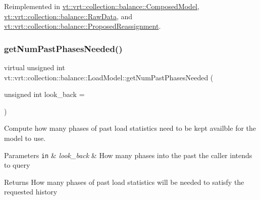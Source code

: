 Reimplemented in \hyperlink{classvt_1_1vrt_1_1collection_1_1balance_1_1_composed_model_a7b383954706cb8069e841a87c3ff3f8f}{vt\+::vrt\+::collection\+::balance\+::\+Composed\+Model}, \hyperlink{structvt_1_1vrt_1_1collection_1_1balance_1_1_raw_data_a586c3223d1f69ee9d5eb2930ff659051}{vt\+::vrt\+::collection\+::balance\+::\+Raw\+Data}, and \hyperlink{structvt_1_1vrt_1_1collection_1_1balance_1_1_proposed_reassignment_ad265d4881094bb11cb538e7340bc8a49}{vt\+::vrt\+::collection\+::balance\+::\+Proposed\+Reassignment}.

\mbox{\label{structvt_1_1vrt_1_1collection_1_1balance_1_1_load_model_ac061725720a2017908090863080b70e5}} 
\subsubsection{\texorpdfstring{get\+Num\+Past\+Phases\+Needed()}{getNumPastPhasesNeeded()}}
{\footnotesize\ttfamily virtual unsigned int vt\+::vrt\+::collection\+::balance\+::\+Load\+Model\+::get\+Num\+Past\+Phases\+Needed (\begin{DoxyParamCaption}\item[{unsigned int}]{look\+\_\+back = {} }\end{DoxyParamCaption})\hspace{0.3cm}{\ttfamily [pure virtual]}}



Compute how many phases of past load statistics need to be kept availble for the model to use. 


\begin{DoxyParams}[1]{Parameters}
\mbox{\tt in}  & {\em look\+\_\+back} & How many phases into the past the caller intends to query\\
\hline
\end{DoxyParams}
\begin{DoxyReturn}{Returns}
How many phases of past load statistics will be needed to satisfy the requested history 
\end{DoxyReturn}


